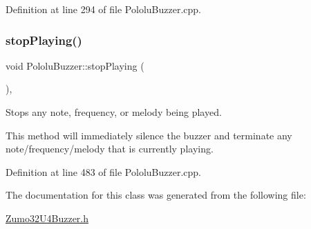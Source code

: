 Definition at line 294 of file Pololu\+Buzzer.\+cpp.

\mbox{\label{class_pololu_buzzer_a233fe0ffe5f23582b1c55beaa718d527}} 
\subsubsection{\texorpdfstring{stop\+Playing()}{stopPlaying()}}
{\footnotesize\ttfamily void Pololu\+Buzzer\+::stop\+Playing (\begin{DoxyParamCaption}{ }\end{DoxyParamCaption})\hspace{0.3cm}{\ttfamily [static]}, {\ttfamily [inherited]}}



Stops any note, frequency, or melody being played. 

This method will immediately silence the buzzer and terminate any note/frequency/melody that is currently playing. 

Definition at line 483 of file Pololu\+Buzzer.\+cpp.



The documentation for this class was generated from the following file\+:\begin{DoxyCompactItemize}
\item 
\hyperlink{_zumo32_u4_buzzer_8h}{Zumo32\+U4\+Buzzer.\+h}\end{DoxyCompactItemize}
